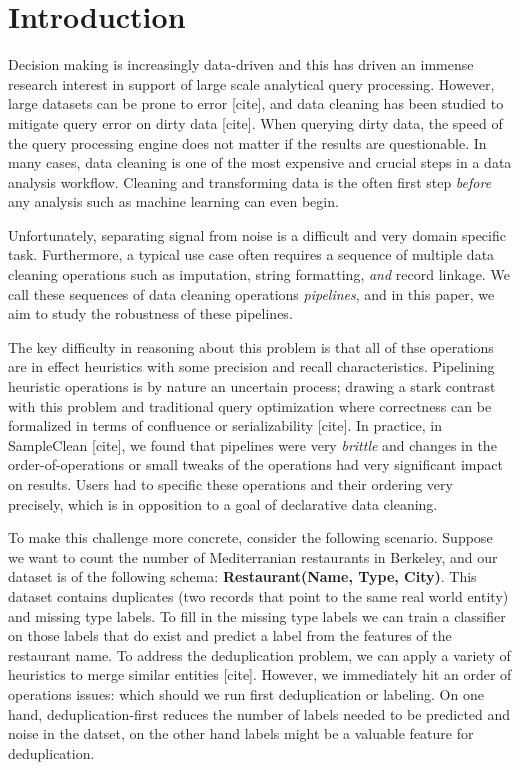 \section{Introduction}
Decision making is increasingly data-driven and this has driven an immense research interest in support of large scale analytical query processing.
However, large datasets can be prone to error [cite], and data cleaning has been studied to mitigate query error on dirty data [cite].
When querying dirty data, the speed of the query processing engine does not matter if the results are questionable.
In many cases, data cleaning is one of the most expensive and crucial steps in a data analysis workflow.
Cleaning and transforming data is the often first step \emph{before} any analysis such as machine learning can even begin.

Unfortunately, separating signal from noise is a difficult and very domain specific task.
Furthermore, a typical use case often requires a sequence of multiple data cleaning operations 
such as imputation, string formatting, \emph{and} record linkage.
We call these sequences of data cleaning operations \emph{pipelines}, and in this paper, we aim to study the robustness of these pipelines.

The key difficulty in reasoning about this problem is that all of thse operations are in effect heuristics with some precision and recall characteristics.
Pipelining heuristic operations is by nature an uncertain process; drawing a stark contrast with this problem and traditional query optimization where correctness can be formalized in terms of confluence or serializability [cite]. 
In practice, in SampleClean [cite], we found that pipelines were very \emph{brittle} and changes in the order-of-operations or small tweaks of the operations had very significant impact on results.
Users had to specific these operations and their ordering very precisely, which is in opposition to a goal of declarative data cleaning.

To make this challenge more concrete, consider the following scenario. 
Suppose we want to count the number of Mediterranian restaurants in Berkeley, and 
our dataset is of the following schema: \textbf{Restaurant(Name, Type, City)}.
This dataset contains duplicates (two records that point to the same real world entity) and missing type labels.
To fill in the missing type labels we can train a classifier on those labels that do exist and predict a label from the features of the restaurant name.
To address the deduplication problem, we can apply a variety of heuristics to merge similar entities [cite].
However, we immediately hit an order of operations issues: which should we run first deduplication or labeling.
On one hand, deduplication-first reduces the number of labels needed to be predicted and noise in the datset, on the other hand labels might be a valuable feature for deduplication.


